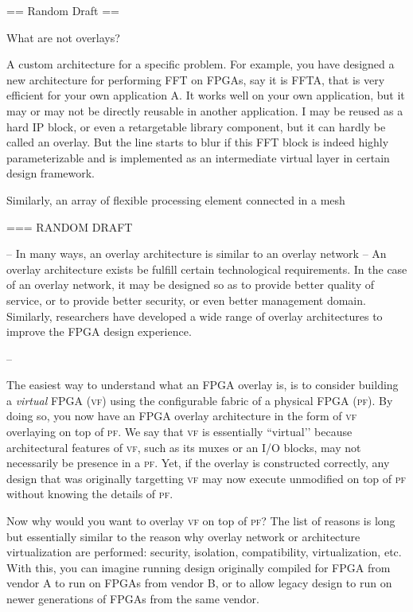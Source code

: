 == Random Draft ==


What are not overlays?


A custom architecture for a specific problem.  For example, you have designed a new architecture for performing FFT on FPGAs, say it is FFTA, that is very efficient for your own application A.  It works well on your own application, but it may or may not be directly reusable in another application.  I may be reused as a hard IP block, or even a retargetable library component, but it can hardly be called an overlay.  But the line starts to blur if this FFT block is indeed highly parameterizable and is implemented as an intermediate virtual layer in certain design framework.


Similarly, an array of flexible processing element connected in a mesh 


===
RANDOM DRAFT


--
In many ways, an overlay architecture is similar to an overlay network -- An overlay architecture exists be fulfill certain technological requirements.  In the case of an overlay network, it may be designed so as to provide better quality of service, or to provide better security, or even better management domain.  Similarly, researchers have developed a wide range of overlay architectures to improve the FPGA design experience.  


--


The easiest way to understand what an FPGA overlay is, is to consider building a \emph{virtual} FPGA (\textsc{vf}) using the configurable fabric of a physical FPGA (\textsc{pf}).  By doing so, you now have an FPGA overlay architecture in the form of \textsc{vf} overlaying on top of \textsc{pf}.  We say that \textsc{vf} is essentially ``virtual’’ because architectural features of \textsc{vf}, such as its muxes or an I/O blocks, may not necessarily be presence in a \textsc{pf}.  Yet, if the overlay is constructed correctly, any design that was originally targetting \textsc{vf} may now execute unmodified on top of \textsc{pf} without knowing the details of \textsc{pf}.


Now why would you want to overlay \textsc{vf} on top of \textsc{pf}?  The list of reasons is long but essentially similar to the reason why overlay network or architecture virtualization are performed: security, isolation, compatibility, virtualization, etc.  With this, you can imagine running design originally compiled for FPGA from vendor A to run on FPGAs from vendor B, or to allow legacy design to run on newer generations of FPGAs from the same vendor.


